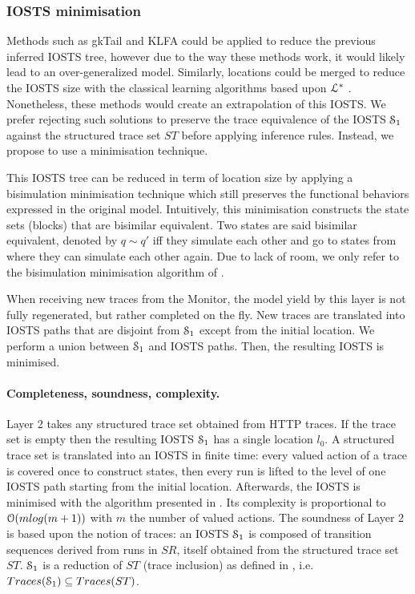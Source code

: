 
\subsubsection{IOSTS minimisation}

Methods such as gkTail and KLFA could be applied to reduce the
previous inferred IOSTS tree, however due to the way these
methods work, it would likely lead to an over-generalized model.
Similarly, locations could be merged to reduce the IOSTS size
with the classical learning algorithms based upon
$\EuScript{L}^*$ \cite{Angluin198787,lambeau08}. Nonetheless,
these methods would create an extrapolation of this IOSTS. We
prefer rejecting such solutions to preserve the trace equivalence
\cite{petrenko06} of the IOSTS $\EuScript{S}_1$ against the
structured trace set $ST$ before applying inference rules.
Instead, we propose to use a minimisation technique.

This IOSTS tree can be reduced in term of location size by
applying a bisimulation minimisation technique which still
preserves the functional behaviors expressed in the original
model.  Intuitively, this minimisation constructs the state sets
(blocks) that are bisimilar equivalent. Two states are said
bisimilar equivalent, denoted by $q \sim q'$ iff they simulate each
other and go to states from where they can simulate each other
again. Due to lack of room, we only refer to the bisimulation
minimisation algorithm of \cite{Fernandez89animplementation}.

When receiving new traces from the Monitor, the model yield by
this layer is not fully regenerated, but rather completed on the
fly. New traces are translated into IOSTS paths that are disjoint
from $\EuScript{S}_1$ except from the initial location. We
perform a union between $\EuScript{S}_1$ and IOSTS paths. Then,
the resulting IOSTS is minimised.

\paragraph{Completeness, soundness, complexity.}

Layer 2 takes any structured trace set obtained from HTTP traces.
If the trace set is empty then the resulting IOSTS
$\EuScript{S}_1$ has a single location $l_0$. A structured trace
set is translated into an IOSTS in finite time: every valued
action of a trace is covered once to construct states, then every
run is lifted to the level of one IOSTS path starting from the
initial location. Afterwards, the IOSTS is minimised with the
algorithm presented in \cite{Fernandez89animplementation}. Its
complexity is proportional to $\EuScript{O}(mlog (m+1))$ with $m$
the number of valued actions. The soundness of Layer 2 is based
upon the notion of traces: an IOSTS $\EuScript{S}_1$ is composed
of transition sequences derived from runs in $SR$, itself
obtained from the structured trace set $ST$. $\EuScript{S}_1$ is
a reduction of $ST$ (trace inclusion) as defined in
\cite{petrenko06}, i.e. $Traces(\EuScript{S}_1) \subseteq Traces(ST)$.

